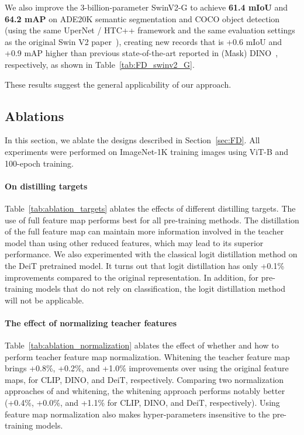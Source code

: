 \documentclass{article}
\begin{document}
We also improve the 3-billion-parameter SwinV2-G to achieve \textbf{61.4 mIoU} and \textbf{64.2 mAP} on ADE20K semantic segmentation and COCO object detection (using the same UperNet / HTC++ framework and the same evaluation settings as the original Swin V2 paper~\cite{swinv2}), creating new records that is +0.6 mIoU and +0.9 mAP higher than previous state-of-the-art reported in (Mask) DINO~\cite{zhang2022dino,li2022mask}, respectively, as shown in Table~\ref{tab:FD_swinv2_G}.

These results suggest the general applicability of our approach.

\subsection{Ablations}

In this section, we ablate the designs described in Section~\ref{sec:FD}. All experiments were performed on ImageNet-1K training images using ViT-B and 100-epoch training.

\paragraph{On distilling targets} Table~\ref{tab:ablation_targets} ablates the effects of different distilling targets. The use of full feature map performs best for all pre-training methods. The distillation of the full feature map can maintain more information involved in the teacher model than using other reduced features, which may lead to its superior performance. We also experimented with the classical logit distillation method on the DeiT pretrained model. It turns out that logit distillation has only +0.1\% improvements compared to the original representation. In addition, for pre-training models that do not rely on classification, the logit distillation method will not be applicable.

\paragraph{The effect of normalizing teacher features} Table~\ref{tab:ablation_normalization} ablates the effect of whether and how to perform teacher feature map normalization. Whitening the teacher feature map brings +0.8\%, +0.2\%, and +1.0\% improvements over using the original feature maps, for CLIP, DINO, and DeiT, respectively. Comparing two normalization approaches of  and whitening, the whitening approach performs notably better (+0.4\%, +0.0\%, and +1.1\% for CLIP, DINO, and DeiT, respectively). Using feature map normalization also makes hyper-parameters insensitive to the pre-training models.
\end{document}
